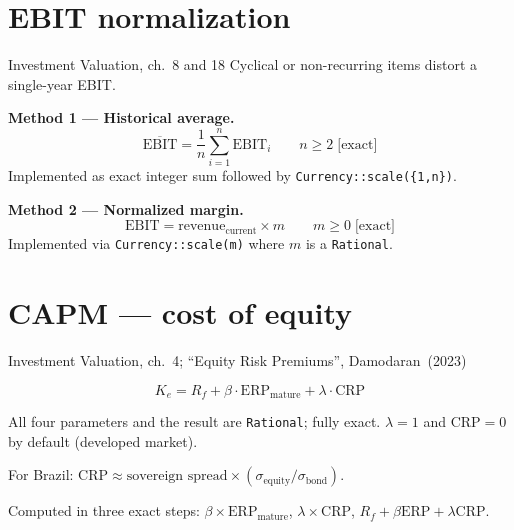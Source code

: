 \documentclass[11pt, a4paper, oneside]{article}
\newcommand{\EBIT}{\mathrm{EBIT}}
\newcommand{\ERP}{\mathrm{ERP}}
\newcommand{\CRP}{\mathrm{CRP}}
\newcommand{\Ke}{K_e}
\newcommand{\Rf}{R_f}
\newcommand{\exact}{\;\text{[exact]}}
\begin{document}
\section{EBIT normalization}
\label{sec:normalize}

\begin{damodaran}{Investment Valuation, ch.~8 and 18}
Cyclical or non-recurring items distort a single-year EBIT.
\end{damodaran}

\textbf{Method 1 --- Historical average.}
\begin{equation}
  \overline{\EBIT} = \frac{1}{n}\sum_{i=1}^{n} \EBIT_i
  \qquad n \geq 2 \exact
\end{equation}
Implemented as exact integer sum followed by
\texttt{Currency::scale(\{1,n\})}.

\textbf{Method 2 --- Normalized margin.}
\begin{equation}
  \EBIT = \text{revenue}_\text{current} \times m
  \qquad m \geq 0 \exact
\end{equation}
Implemented via \texttt{Currency::scale(m)} where $m$ is a \texttt{Rational}.

\section{CAPM --- cost of equity}
\label{sec:capm}

\begin{damodaran}{Investment Valuation, ch.~4; ``Equity Risk Premiums'', Damodaran~(2023)}
\end{damodaran}

\begin{equation}
  \Ke = \Rf + \beta \cdot \ERP_\text{mature} + \lambda \cdot \CRP
  \label{eq:capm}
\end{equation}

All four parameters and the result are \texttt{Rational}; fully exact.
$\lambda = 1$ and $\CRP = 0$ by default (developed market).

For Brazil: $\CRP \approx \text{sovereign spread} \times (\sigma_\text{equity}/\sigma_\text{bond})$.

\begin{impl}{}
Computed in three exact steps:
$\beta \times \ERP_\text{mature}$,
$\lambda \times \CRP$,
$\Rf + \beta\ERP + \lambda\CRP$.
\end{impl}
\end{document}
